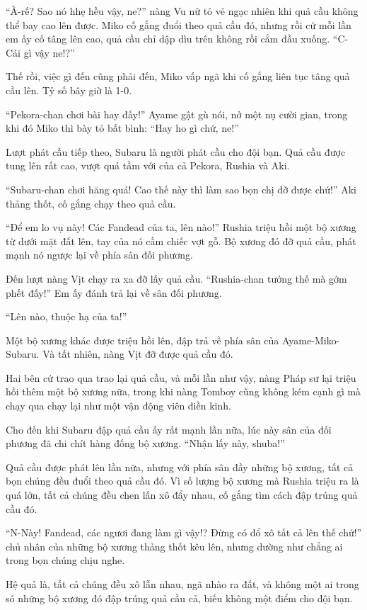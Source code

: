 \documentclass[../main.tex]{subfiles}
\begin{document}
``À-rế? Sao nó hhẹ hều vậy, ne?'' nàng Vu nữ tỏ vẻ ngạc nhiên khi quả cầu không thể bay cao lên được. Miko cố gắng đuổi theo quả cầu đó, nhưng rồi cứ mỗi lần em ấy cố tâng lên cao, quả cầu chỉ dập dìu trên không rồi cắm đầu xuống. ``C-Cái gì vậy ne!?''

Thế rồi, việc gì đến cũng phải đến, Miko vấp ngã khi cố gắng liên tục tâng quả cầu lên. Tỷ số bây giờ là 1-0.

``Pekora-chan chơi bài hay đấy!'' Ayame gật gù nói, nở một nụ cười gian, trong khi đó Miko thì bày tỏ bất bình: ``Hay ho gì chứ, ne!''

Lượt phát cầu tiếp theo, Subaru là người phát cầu cho đội bạn. Quả cầu được tung lên rất cao, vượt quá tầm với của cả Pekora, Rushia và Aki.

``Subaru-chan chơi hăng quá! Cao thế này thì làm sao bọn chị đỡ được chứ!'' Aki thảng thốt, cố gắng chạy theo quả cầu.

``Để em lo vụ này! Các Fandead của ta, lên nào!'' Rushia triệu hồi một bộ xương từ dưới mặt đất lên, tay của nó cầm chiếc vợt gỗ. Bộ xương đó đỡ quả cầu, phát mạnh nó ngược lại về phía sân đối phương.

Đến lượt nàng Vịt chạy ra xa đỡ lấy quả cầu. ``Rushia-chan tưởng thế mà gớm phết đấy!'' Em ấy đánh trả lại về sân đối phương.

``Lên nào, thuộc hạ của ta!''

Một bộ xương khác được triệu hồi lên, đập trả về phía sân của Ayame-Miko-Subaru. Và tất nhiên, nàng Vịt đỡ được quả cầu đó.

Hai bên cứ trao qua trao lại quả cầu, và mỗi lần như vậy, nàng Pháp sư lại triệu hồi thêm một bộ xương nữa, trong khi nàng Tomboy cũng không kém cạnh gì mà chạy qua chạy lại như một vận động viên điền kinh.

Cho đến khi Subaru đập quả cầu ấy rất mạnh lần nữa, lúc này sân của đối phương đã chi chít hàng đống bộ xương. ``Nhận lấy này, shuba!''

Quả cầu được phát lên lần nữa, nhưng với phía sân đầy những bộ xương, tất cả bọn chúng đều đuổi theo quả cầu đó. Vì số lượng bộ xương mà Rushia triệu ra là quá lớn, tất cả chúng đều chen lấn xô đẩy nhau, cố gắng tìm cách đập trúng quả cầu đó.

``N-Này! Fandead, các ngươi đang làm gì vậy!? Đừng có đổ xô tất cả lên thế chứ!'' chủ nhân của những bộ xương thảng thốt kêu lên, nhưng dường như chẳng ai trong bọn chúng chịu nghe.

Hệ quả là, tất cả chúng đều xô lẫn nhau, ngã nhào ra đất, và không một ai trong só những bộ xương đó đập trúng quả cầu cả, biếu không một điểm cho đội bạn.
\end{document}

